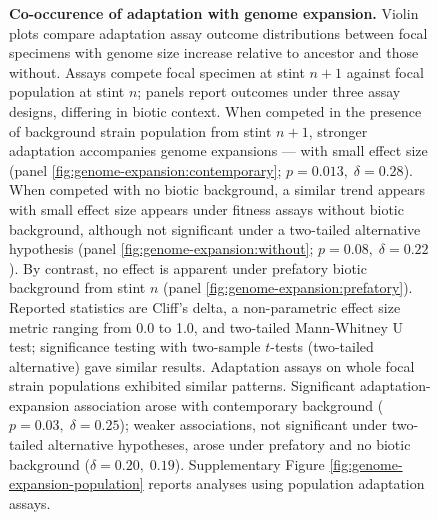 \begin{figure}
\caption{
    \textbf{Co-occurence of adaptation with genome expansion.}
    \footnotesize
    Violin plots compare adaptation assay outcome distributions between focal specimens with genome size increase relative to ancestor and those without.
    Assays compete focal specimen at stint $n+1$ against focal population at stint $n$;
    panels report outcomes under three assay designs, differing in biotic context.
    When competed in the presence of background strain population from stint $n+1$, stronger adaptation accompanies genome expansions --- with small effect size (panel \ref{fig:genome-expansion:contemporary}; $p = 0.013, \; \delta = 0.28$).
    When competed with no biotic background, a similar trend appears with small effect size appears under fitness assays without biotic background, although not significant under a two-tailed alternative hypothesis (panel \ref{fig:genome-expansion:without}; $p=0.08, \; \delta = 0.22$).
    By contrast, no effect is apparent under prefatory biotic background from stint $n$ (panel \ref{fig:genome-expansion:prefatory}).
    Reported statistics are Cliff's delta, a non-parametric effect size metric ranging from 0.0 to 1.0, and two-tailed Mann-Whitney U test; significance testing with two-sample $t$-tests (two-tailed alternative) gave similar results.
    Adaptation assays on whole focal strain populations exhibited similar patterns.
    Significant adaptation-expansion association arose with contemporary background ($p=0.03, \; \delta=0.25$);
    weaker associations, not significant under two-tailed alternative hypotheses, arose under prefatory and no biotic background ($\delta=0.20,\; 0.19$).
    Supplementary Figure \ref{fig:genome-expansion-population} reports analyses using population adaptation assays.
}
\label{fig:genome-expansion}

\end{figure}
